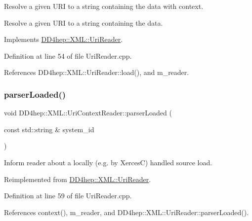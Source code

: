 Resolve a given U\+RI to a string containing the data with context. 

Resolve a given U\+RI to a string containing the data. 

Implements \hyperlink{class_d_d4hep_1_1_x_m_l_1_1_uri_reader_a80a35ded7f30ba3b1954edb0e0493d6f}{D\+D4hep\+::\+X\+M\+L\+::\+Uri\+Reader}.



Definition at line 54 of file Uri\+Reader.\+cpp.



References D\+D4hep\+::\+X\+M\+L\+::\+Uri\+Reader\+::load(), and m\+\_\+reader.

\hypertarget{class_d_d4hep_1_1_x_m_l_1_1_uri_context_reader_ae3ec9a7f4f18adf4dcac1d894453dbd0}{}\label{class_d_d4hep_1_1_x_m_l_1_1_uri_context_reader_ae3ec9a7f4f18adf4dcac1d894453dbd0} 
\subsubsection{\texorpdfstring{parser\+Loaded()}{parserLoaded()}\hspace{0.1cm}{\footnotesize\ttfamily [1/2]}}
{\footnotesize\ttfamily void D\+D4hep\+::\+X\+M\+L\+::\+Uri\+Context\+Reader\+::parser\+Loaded (\begin{DoxyParamCaption}\item[{const std\+::string \&}]{system\+\_\+id }\end{DoxyParamCaption})\hspace{0.3cm}{\ttfamily [virtual]}}



Inform reader about a locally (e.\+g. by XercesC) handled source load. 



Reimplemented from \hyperlink{class_d_d4hep_1_1_x_m_l_1_1_uri_reader_a58d5ece4bc5ee3b5d1d8f9eac85baecd}{D\+D4hep\+::\+X\+M\+L\+::\+Uri\+Reader}.



Definition at line 59 of file Uri\+Reader.\+cpp.



References context(), m\+\_\+reader, and D\+D4hep\+::\+X\+M\+L\+::\+Uri\+Reader\+::parser\+Loaded().

\hypertarget{class_d_d4hep_1_1_x_m_l_1_1_uri_context_reader_ad55127447ec6782a4bf610ea2a33e233}{}\label{class_d_d4hep_1_1_x_m_l_1_1_uri_context_reader_ad55127447ec6782a4bf610ea2a33e233} 
